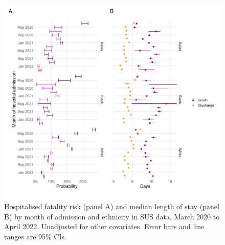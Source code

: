 \begin{figure}[htbp!]
    \centering
    \includegraphics[width=\textwidth]{hfr_month_ethn.pdf}
    \caption[Hospitalised fatality risk and median length of stay by month of admission and ethnicity in SUS data, March 2020 to April 2022]{Hospitalised fatality risk (panel A) and median length of stay (panel B) by month of admission and ethnicity in SUS data, March 2020 to April 2022. Unadjusted for other covariates. Error bars and line ranges are 95\% CIs.}
\end{figure}

